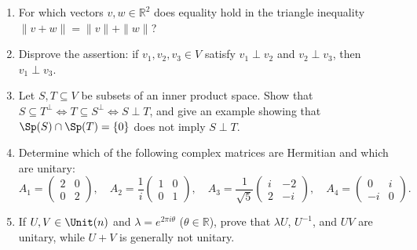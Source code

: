 \begin{exercise}
  \label{exc:orthogonality_unitary_true_false}
  \begin{enumerate}[label=\textbf{(\alph*)}]
    \item For which vectors $v, w \in \mathbb{R}^2$ does equality hold in the triangle inequality $\|v + w\| = \|v\| + \|w\|$?
    \item Disprove the assertion: if $v_1, v_2, v_3 \in V$ satisfy $v_1 \perp v_2$ and $v_2 \perp v_3$, then $v_1 \perp v_3$.
    \item Let $S, T \subseteq V$ be subsets of an inner product space. Show that $S \subseteq T^\perp \iff T \subseteq S^\perp \iff S \perp T$, and give an example showing that $\Sp(S) \cap \Sp(T) = \{0\}$ does not imply $S \perp T$.
    \item Determine which of the following complex matrices are Hermitian and which are unitary:
    \[
    A_1 = \begin{pmatrix} 2 & 0 \\ 0 & 2 \end{pmatrix}, \quad A_2 = \frac{1}{i}\begin{pmatrix} 1 & 0 \\ 0 & 1 \end{pmatrix}, \quad A_3 = \frac{1}{\sqrt{5}}\begin{pmatrix} i & -2 \\ 2 & -i \end{pmatrix}, \quad A_4 = \begin{pmatrix} 0 & i \\ -i & 0 \end{pmatrix}.
    \]
    \item If $U, V \in \Unit(n)$ and $\lambda = e^{2\pi i \theta}$ ($\theta \in \mathbb{R}$), prove that $\lambda U$, $U^{-1}$, and $UV$ are unitary, while $U + V$ is generally not unitary.
  \end{enumerate}

\end{exercise}
